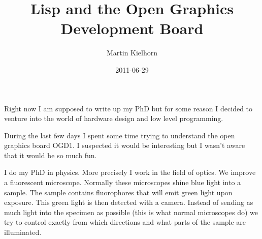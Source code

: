\documentclass[twocolumn,DIV19]{scrartcl}
\title{Lisp and the Open Graphics Development Board}
\author{Martin Kielhorn}
\date{2011-06-29}
\begin{document}
\maketitle 

Right now I am supposed to write up my PhD but for some reason I
decided to venture into the world of hardware design and low level
programming.

During the last few days I spent some time trying to understand the
open graphics board OGD1. I suspected it would be interesting but I
wasn't aware that it would be so much fun.

I do my PhD in physics. More precisely I work in the field of
optics. We improve a fluorescent microscope. Normally these
microscopes shine blue light into a sample. The sample contains
fluorophores that will emit green light upon exposure. This green
light is then detected with a camera. Instead of sending as much light
into the specimen as possible (this is what normal microscopes do) we
try to control exactly from which directions and what parts of the
sample are illuminated.
\end{document}

